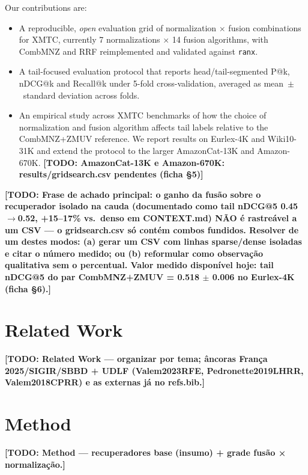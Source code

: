 \documentclass[sigconf,nonacm]{acmart}
\newcommand{\todo}[1]{\textbf{[TODO: #1]}}
\begin{document}
\noindent Our contributions are:
\begin{itemize}
  \item A reproducible, \emph{open} evaluation grid of normalization $\times$ fusion
        combinations for XMTC, currently 7 normalizations $\times$ 14 fusion
        algorithms, with CombMNZ and RRF reimplemented and validated against
        \texttt{ranx}.
  \item A tail-focused evaluation protocol that reports head/tail-segmented P@k,
        nDCG@k and Recall@k under 5-fold cross-validation, averaged as
        mean~$\pm$~standard deviation across folds.
  \item An empirical study across XMTC benchmarks of how the choice of normalization
        and fusion algorithm affects tail labels relative to the CombMNZ+ZMUV
        reference. We report results on Eurlex-4K and Wiki10-31K and extend the
        protocol to the larger AmazonCat-13K and Amazon-670K.
        \todo{AmazonCat-13K e Amazon-670K: results/gridsearch.csv pendentes (ficha §5)}
\end{itemize}

\noindent \todo{Frase de achado principal: o ganho da fusão sobre o recuperador
isolado na cauda (documentado como tail nDCG@5 0.45$\to$0.52, +15--17\% vs.\ denso em
CONTEXT.md) NÃO é rastreável a um CSV --- o gridsearch.csv só contém combos fundidos.
Resolver de um destes modos: (a) gerar um CSV com linhas sparse/dense isoladas e citar
o número medido; ou (b) reformular como observação qualitativa sem o percentual. Valor
medido disponível hoje: tail nDCG@5 do par CombMNZ+ZMUV = 0.518 $\pm$ 0.006 no
Eurlex-4K (ficha §6).}

\section{Related Work}
\todo{Related Work — organizar por tema; âncoras França 2025/SIGIR/SBBD + UDLF
(Valem2023RFE, Pedronette2019LHRR, Valem2018CPRR) e as externas já no refs.bib.}

\section{Method}
\todo{Method — recuperadores base (insumo) + grade fusão × normalização.}
\end{document}
